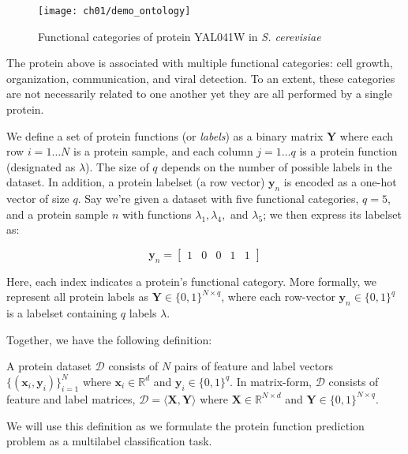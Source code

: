 \begin{figure}[!h]
  \centering
  \texttt{[image: ch01/demo\_ontology]}
  \caption{Functional categories of protein YAL041W in \textit{S. cerevisiae}}
  \label{demo:yeast_go}
\end{figure}

\noindent The protein above is associated with multiple functional
categories: cell growth, organization, communication, and viral detection. To
an extent, these categories are not necessarily related to one another yet
they are all performed by a single protein.

\par We define a set of protein functions (or \textit{labels}) as a binary
matrix $\mathbf{Y}$ where each row $i=1 \dots N$ is a protein sample, and
each column $j=1 \dots q$ is a protein function (designated as $\lambda$).
The size of $q$ depends on the number of possible labels in the dataset. In
addition, a protein labelset (a row vector) $\mathbf{y}_n$ is encoded as a
one-hot vector of size $q$. Say we're given a dataset with five functional
categories, $q=5$, and a protein sample $n$ with functions
$\lambda_1, \lambda_4,$ and $\lambda_5$; we then express its labelset as:

\[
    \mathbf{y}_n = \left[\begin{matrix}
        1 & 0 & 0 & 1 & 1
    \end{matrix} \right]
\]

\noindent Here, each index indicates a protein's functional category. More formally, we
represent all protein labels as $\mathbf{Y} \in \{0,1\}^{N \times q}$, where each
row-vector $\mathbf{y}_n \in \{0,1\}^q$ is a labelset containing $q$ labels
$\lambda$.

\par Together, we have the following definition:

\begin{definition}{}
A protein dataset $\mathcal{D}$ consists of $N$ pairs of feature and label
vectors $\{(\mathbf{x}_i, \mathbf{y}_i)\}_{i=1}^{N}$ where $\mathbf{x}_i \in
\mathbb{R}^d$ and $\mathbf{y}_i \in \{0,1\}^q$. In matrix-form, $\mathcal{D}$
consists of feature and label matrices, $\mathcal{D} = \langle \mathbf{X},
\mathbf{Y} \rangle$ where $\mathbf{X} \in \mathbb{R}^{N \times d}$ and
$\mathbf{Y} \in \{0,1\}^{N \times q}$.
\end{definition}

\par We will use this definition as we formulate the protein function
prediction problem as a multilabel classification task.


